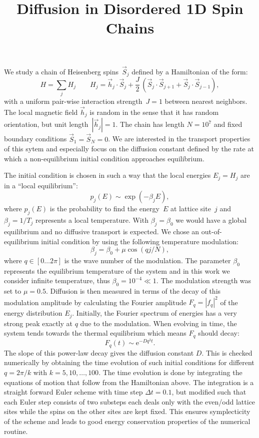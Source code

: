 \documentclass[a4paper,11pt]{scrartcl}
\title{Diffusion in Disordered 1D Spin Chains}
\author{}
\newcommand{\e}{\mathrm{e}}
\begin{document}
\maketitle

We study a chain of Heisenberg spins~$\vec S_j$ defined by a Hamiltonian of the form:
\begin{equation}
 H = \sum_j H_j\qquad H_j = \vec h_j \cdot \vec S_j + \frac J2 \, (\vec S_j \cdot \vec S_{j+1} + \vec S_j \cdot \vec S_{j-1}),
\end{equation} 
with a uniform pair-wise interaction strength~$J=1$ between nearest neighbors.
The local magnetic field $\vec h_j$ is random in the sense that it has random orientation, but unit length~$|\vec h_j|=1$.
The chain has length $N=10^7$ and fixed boundary conditions $\vec S_1 = \vec S_N = 0$.
We are interested in the transport properties of this sytem and especially focus on the diffusion constant defined by the rate at which a non-equilibrium initial condition approaches equilibrium.

The initial condition is chosen in such a way that the local energies $E_j = H_j$ are in a ``local equilibrium'':
\begin{equation}
 p_j(E) \sim \exp(-\beta_j E),
\end{equation}
where $p_j(E)$ is the probability to find the energy~$E$ at lattice site~$j$ and $\beta_j=1/T_j$ represents a local temperature.
With $\beta_j=\beta_0$ we would have a global equilibrium and no diffusive transport is expected.
We chose an out-of-equilibrium initial condition by using the following temperature modulation:
\begin{equation}
 \beta_j = \beta_0 + \mu \cos( q j / N ),
\end{equation} 
where $q\in[0\dots 2\pi]$ is the wave number of the modulation.
The parameter $\beta_0$ represents the equilibrium temperature of the system and in this work we consider infinite temperature, thus $\beta_0=10^{-4}\ll 1$.
The modulation strength was set to $\mu=0.5$.
Diffusion is then measured in terms of the decay of this modulation amplitude by calculating the Fourier amplitude $F_q = |f_q|^2$ of the energy distribution $E_j$.
Initially, the Fourier spectrum of energies has a very strong peak exactly at $q$ due to the modulation.
When evolving in time, the system tends towards the thermal equilibrium which means $F_q$ should decay:
\begin{equation}
 F_q(t) \sim \e^{-D q^2 t}.
\end{equation}
The slope of this power-law decay gives the diffusion constant $D$.
This is checked numerically by obtaining the time evolution of such initial conditions for different $q=2\pi/k$ with $k=5,10,\dots,100$.
The time evolution is done by integrating the equations of motion that follow from the Hamiltonian above.
The integration is a straight forward Euler scheme with time step $\Delta t=0.1$, but modified such that each Euler step consists of two substeps each deals only with the even/odd lattice sites while the spins on the other sites are kept fixed.
This ensures symplecticity of the scheme and leads to good energy conservation properties of the numerical routine.
\end{document}
